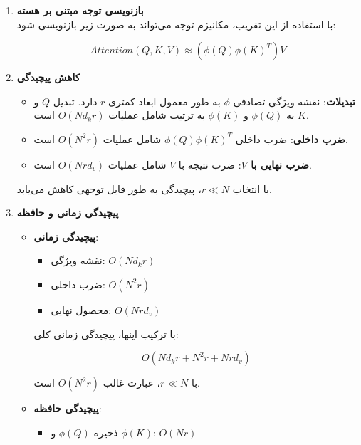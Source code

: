 \begin{qsolve}
	\begin{enumerate}
		
		
			\item \textbf{بازنویسی توجه مبتنی بر هسته}\\
			با استفاده از این تقریب، مکانیزم توجه می‌تواند به صورت زیر بازنویسی شود:
			
			\[ Attention(Q, K, V) \approx \left(\phi(Q) \phi(K)^T \right) V \]
		
		
		
		
			\item \textbf{کاهش پیچیدگی}\\
			\begin{itemize}
					\item \textbf{تبدیلات}: نقشه ویژگی تصادفی \( \phi \) به طور معمول ابعاد کمتری \( r \) دارد. تبدیل \( Q \) و \( K \) به \( \phi(Q) \) و \( \phi(K) \) به ترتیب شامل عملیات \( O(Nd_kr) \) است.
					\item \textbf{ضرب داخلی}: ضرب داخلی \( \phi(Q) \phi(K)^T \) شامل عملیات \( O(N^2 r) \) است.
					\item \textbf{ضرب نهایی با \( V \)}: ضرب نتیجه با \( V \) شامل عملیات \( O(Nrd_v) \) است.
				\end{itemize}
			با انتخاب \( r \ll N \)، پیچیدگی به طور قابل توجهی کاهش می‌یابد.
		
		
		
		
		
		
		\item \textbf{پیچیدگی زمانی و حافظه}\\
		\begin{itemize}
			\item \textbf{پیچیدگی زمانی}:
			\begin{itemize}
				\item نقشه ویژگی: \( O(Nd_kr) \)
				\item ضرب داخلی: \( O(N^2r) \)
				\item محصول نهایی: \( O(Nrd_v) \)
			\end{itemize}
			
			با ترکیب اینها، پیچیدگی زمانی کلی:
			
			\[ O(Nd_kr + N^2r + Nrd_v) \]
			
			با \( r \ll N \)، عبارت غالب \( O(N^2r) \) است.
			
			\item \textbf{پیچیدگی حافظه}:
			\begin{itemize}
				\item ذخیره \( \phi(Q) \) و \( \phi(K) \): \( O(Nr) \)
			\end{itemize}
		\end{itemize}
		
		
		
	\end{enumerate}
\end{qsolve}


